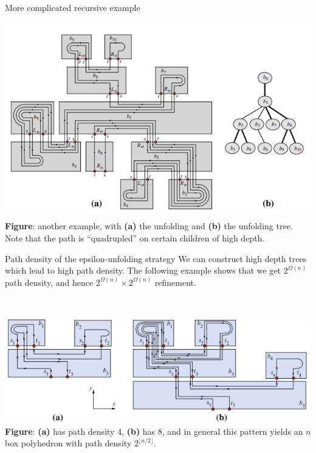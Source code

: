 \documentclass[handout]{beamer}
\theoremstyle{plain}
\begin{document}
  \begin{frame}{More complicated recursive example}
    \begin{center}
      \includegraphics[width=.9\textwidth]{./figs/Example_with_much_doubling.png}\\
      \tiny \textbf{Figure}: another example, with \textbf{(a)} the unfolding and \textbf{(b)} the unfolding tree. 
      Note that the path is ``quadrupled'' on certain children of high depth.
    \end{center}  
  \end{frame}

  \begin{frame}{Path density of the epsilon-unfolding strategy}
    We can construct high depth trees which lead to high path density.
    The following example shows that we get $2^{\Omega(n)}$ path density, and hence $2^{\Omega(n)} \times 2^{\Omega(n)}$ refinement.
    
    \;\\

    \begin{center}
      \includegraphics[width=\textwidth]{./figs/Exponential_path_density.png}\\
      \tiny \textbf{Figure}: \textbf{(a)} has path density 4, \textbf{(b)} has 8, and in general this pattern yields an $n$ box polyhedron with path density $2^{\lfloor n/2 \rfloor}$.
    \end{center}
  \end{frame}
\end{document}
